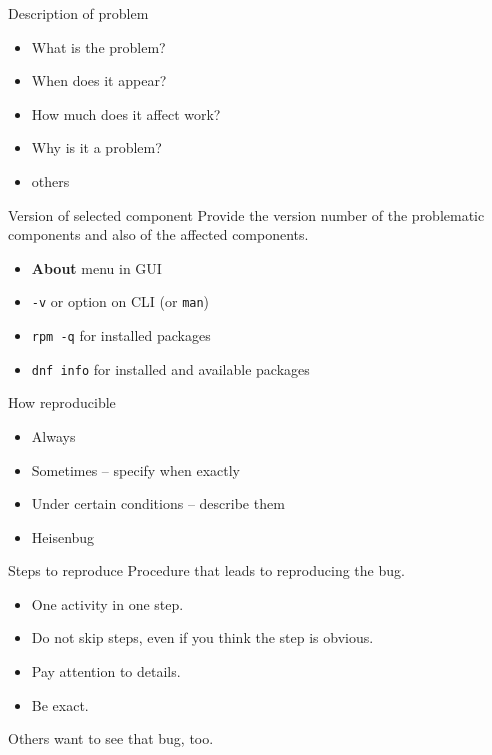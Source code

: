 \documentclass[12pt,aspectratio=169]{beamer}
\begin{document}
\begin{frame}{Description of problem}
\begin{itemize}
	\item What is the problem?
	\item When does it appear?
	\item How much does it affect work?
	\item Why is it a problem?
	\item others
\end{itemize}
\end{frame}

\begin{frame}[fragile]{Version of selected component}
Provide the version number of the problematic components and also of the affected components.
\begin{itemize}
	\item {\color{blue}\textbf{About}} menu in GUI
	\item {\color{blue}\texttt{-v}} or {\color{blue}{\verb|--version|}} option on CLI (or \texttt{man})
	\item {\color{blue}\texttt{rpm -q}} for installed packages
	\item {\color{blue}\texttt{dnf info}} for installed and available packages
\end{itemize}
\end{frame}

\begin{frame}{How reproducible}
\begin{itemize}
	\item Always
	\item Sometimes -- specify when exactly
	\item Under certain conditions -- describe them
	\item Heisenbug 
\end{itemize}
\end{frame}

\begin{frame}{Steps to reproduce}
Procedure that leads to reproducing the bug.
\begin{itemize}
	\item One activity in one step.
	\item Do not skip steps, even if you think the step is obvious.
	\item Pay attention to details.
	\item Be exact.
\end{itemize}
Others want to see that bug, too. 
\end{frame}
\end{document}
